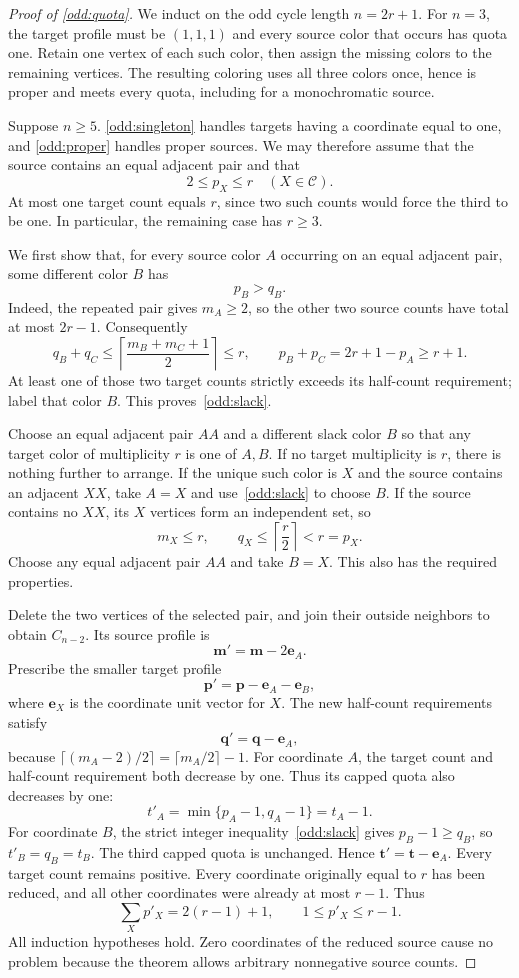\documentclass[11pt,reqno]{amsart}
\numberwithin{equation}{section}
\theoremstyle{definition}
\theoremstyle{remark}
\begin{document}
\begin{proof}[Proof of \cref{odd:quota}]
We induct on the odd cycle length $n=2r+1$.
For $n=3$, the target profile must be $(1,1,1)$ and every source
color that occurs has quota one. Retain one vertex of each such
color, then assign the missing colors to the remaining vertices.
The resulting coloring uses all three colors once, hence is proper
and meets every quota, including for a monochromatic source.

Suppose $n\ge5$. \cref{odd:singleton} handles targets having
a coordinate equal to one, and \cref{odd:proper} handles
proper sources. We may therefore assume that the source contains an
equal adjacent pair and that
\[
2\le p_X\le r\quad(X\in\mathcal C).
\]
At most one target count equals $r$, since two such counts would
force the third to be one. In particular, the remaining case has
$r\ge3$.

We first show that, for every source color $A$ occurring on an equal
adjacent pair, some different color $B$ has
\begin{equation}\label{odd:slack}
p_B>q_B.
\end{equation}
Indeed, the repeated pair gives $m_A\ge2$, so the other two
source counts have total at most $2r-1$. Consequently
\[
q_B+q_C
\le\left\lceil\frac{m_B+m_C+1}{2}\right\rceil\le r,
\qquad
p_B+p_C=2r+1-p_A\ge r+1.
\]
At least one of those two target counts strictly exceeds its
half-count requirement; label that color $B$.
This proves~\eqref{odd:slack}.

Choose an equal adjacent pair $AA$ and a different slack color $B$
so that any target color of multiplicity $r$ is one of $A,B$.
If no target multiplicity is $r$, there is nothing further to arrange.
If the unique such color is $X$ and the source contains an adjacent
$XX$, take $A=X$ and use~\eqref{odd:slack} to choose $B$.
If the source contains no $XX$, its $X$ vertices form an independent
set, so
\[
m_X\le r,
\qquad q_X\le\left\lceil\frac r2\right\rceil<r=p_X.
\]
Choose any equal adjacent pair $AA$ and take $B=X$. This also
has the required properties.

Delete the two vertices of the selected pair, and join their outside
neighbors to obtain $C_{n-2}$. Its source profile is
\[
\mathbf m'=\mathbf m-2\mathbf e_A.
\]
Prescribe the smaller target profile
\[
\mathbf p'=\mathbf p-\mathbf e_A-\mathbf e_B,
\]
where $\mathbf e_X$ is the coordinate unit vector for $X$.
The new half-count requirements satisfy
\[
\mathbf q'=\mathbf q-\mathbf e_A,
\]
because $\lceil(m_A-2)/2\rceil=\lceil m_A/2\rceil-1$.
For coordinate $A$, the target count and half-count requirement
both decrease by one. Thus its capped quota also decreases by one:
\[
t'_A=\min\{p_A-1,q_A-1\}=t_A-1.
\]
For coordinate $B$, the strict integer inequality~\eqref{odd:slack}
gives $p_B-1\ge q_B$, so $t'_B=q_B=t_B$. The third capped quota
is unchanged. Hence $\mathbf t'=\mathbf t-\mathbf e_A$.
Every target count remains positive. Every coordinate originally
equal to $r$ has been reduced, and all other coordinates were already
at most $r-1$. Thus
\[
\sum_Xp'_X=2(r-1)+1,
\qquad 1\le p'_X\le r-1.
\]
All induction hypotheses hold. Zero coordinates of the reduced source
cause no problem because the theorem allows arbitrary nonnegative
source counts.


\end{proof}
\end{document}
